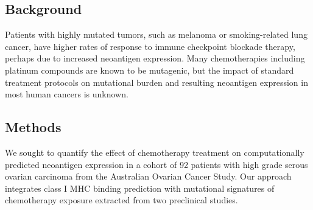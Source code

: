 \subsection*{Background}
Patients with highly mutated tumors, such as melanoma or smoking-related lung cancer, have higher rates of response to immune checkpoint blockade therapy, perhaps due to increased neoantigen expression. Many chemotherapies including platinum compounds are known to be mutagenic, but the impact of standard treatment protocols on mutational burden and resulting neoantigen expression in most human cancers is unknown.


\subsection*{Methods}

We sought to quantify the effect of chemotherapy treatment on computationally predicted neoantigen expression in a cohort of 92 patients with high grade serous ovarian carcinoma from the Australian Ovarian Cancer Study. Our approach integrates class I MHC binding prediction with mutational signatures of chemotherapy exposure extracted from two preclinical studies.




